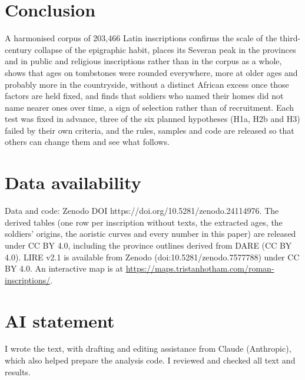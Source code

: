 \documentclass[11pt,a4paper]{article}
\begin{document}
\section{Conclusion}\label{sec:conc}
A harmonised corpus of 203,466 Latin inscriptions confirms the scale of the third-century collapse of the epigraphic habit, places its Severan peak in the provinces and in public and religious inscriptions rather than in the corpus as a whole, shows that ages on tombstones were rounded everywhere, more at older ages and probably more in the countryside, without a distinct African excess once those factors are held fixed, and finds that soldiers who named their homes did not name nearer ones over time, a sign of selection rather than of recruitment. Each test was fixed in advance, three of the six planned hypotheses (H1a, H2b and H3) failed by their own criteria, and the rules, samples and code are released so that others can change them and see what follows.

\section*{Data availability}
Data and code: Zenodo DOI https://doi.org/10.5281/zenodo.24114976. The derived tables (one row per inscription without texts, the extracted ages, the soldiers' origins, the aoristic curves and every number in this paper) are released under CC BY 4.0, including the province outlines derived from DARE (CC BY 4.0). LIRE v2.1 is available from Zenodo (doi:10.5281/zenodo.7577788) under CC BY 4.0. An interactive map is at \url{https://maps.tristanhotham.com/roman-inscriptions/}.

\section*{AI statement}
I wrote the text, with drafting and editing assistance from Claude (Anthropic), which also helped prepare the analysis code. I reviewed and checked all text and results.
\end{document}
